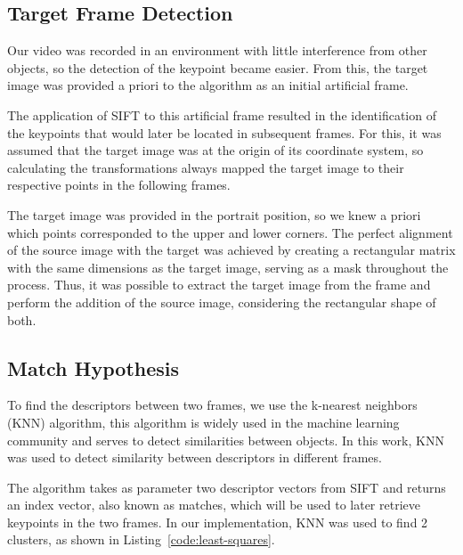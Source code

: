 \documentclass[]{IEEEtran}
\begin{document}
\subsection{Target Frame Detection}

Our video was recorded in an environment with little interference from other objects, so the detection of the keypoint became easier. From this, the target image was provided a priori to the algorithm as an initial artificial frame.

The application of SIFT to this artificial frame resulted in the identification of the keypoints that would later be located in subsequent frames. For this, it was assumed that the target image was at the origin of its coordinate system, so calculating the transformations always mapped the target image to their respective points in the following frames.

The target image was provided in the portrait position, so we knew a priori which points corresponded to the upper and lower corners. The perfect alignment of the source image with the target was achieved by creating a rectangular matrix with the same dimensions as the target image, serving as a mask throughout the process. Thus, it was possible to extract the target image from the frame and perform the addition of the source image, considering the rectangular shape of both.


\subsection{Match Hypothesis}

To find the descriptors between two frames, we use the k-nearest neighbors (KNN) algorithm, this algorithm is widely used in the machine learning community and serves to detect similarities between objects. In this work, KNN was used to detect similarity between descriptors in different frames.

The algorithm takes as parameter two descriptor vectors from SIFT and returns an index vector, also known as matches, which will be used to later retrieve keypoints in the two frames. In our implementation, KNN was used to find 2 clusters, as shown in Listing~\ref{code:least-squares}.
\end{document}
